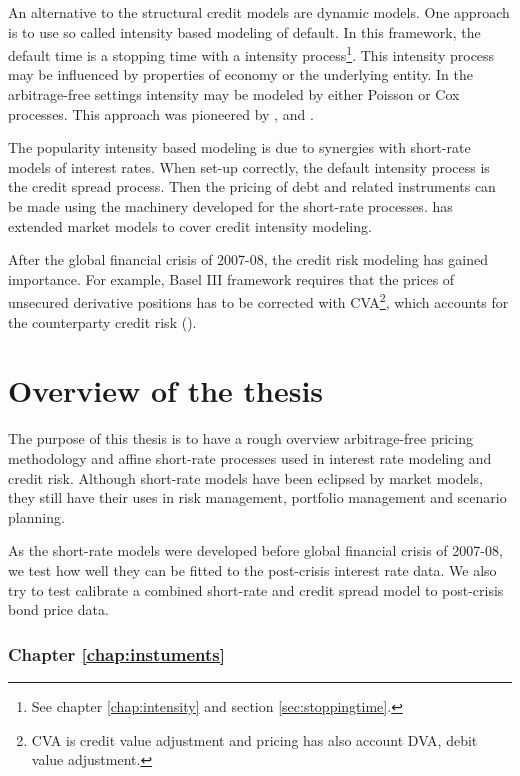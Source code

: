 An alternative to the structural credit models are dynamic models. One approach is to use so called intensity based modeling of default. In this framework, the default time is a stopping time with a intensity process\footnote{See chapter \ref{chap:intensity} and section \ref{sec:stoppingtime}.}. This intensity process may be influenced by properties of economy or the underlying entity. In the arbitrage-free settings intensity may be modeled by either Poisson or Cox processes. This approach was pioneered by \textcite{artzner1995default}, \textcite{jarrow1995pricing} and \textcite{lando1998cox}.

The popularity intensity based modeling is due to synergies with short-rate models of interest rates. When set-up correctly, the default intensity process is the credit spread process. Then the pricing of debt and related instruments can be made using the machinery developed for the short-rate processes. \textcite{schonbucher2001libor} has extended market models to cover credit intensity modeling.

After the global financial crisis of 2007-08, the credit risk modeling has gained importance. For example, Basel III framework requires that the prices of unsecured derivative positions has to be corrected with CVA\footnote{CVA is credit value adjustment and pricing has also account DVA, debit value adjustment.}, which accounts for the counterparty credit risk (\cite{basel2015cva}).

\section{Overview of the thesis}

The purpose of this thesis is to have a rough overview arbitrage-free pricing methodology and affine short-rate processes used in interest rate modeling and credit risk. Although short-rate models have been eclipsed by market models, they still have their uses in risk management, portfolio management and scenario planning.

As the short-rate models were developed before global financial crisis of 2007-08, we test how well they can be fitted to the post-crisis interest rate data. We also try to test calibrate a combined short-rate and credit spread model to post-crisis bond price data.

\subsubsection*{Chapter \ref{chap:instuments}}


